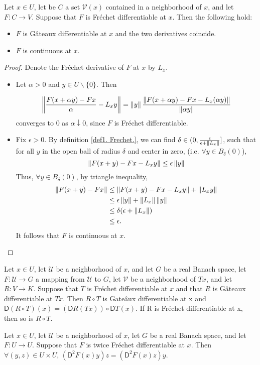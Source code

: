 \begin{lemma}
	Let $x \in U$, let be $C$ a set $\mathcal{V}(x)$ contained in a neighborhood of $x$, and let $F: C \rightarrow V$. Suppose that $F$ is Fr\'echet differentiable at $x$. Then the following hold:
	\begin{itemize}
	\item  $F$ is G\^ateaux differentiable at $x$ and the two derivatives coincide.
	\item $F$ is continuous at $x$.
	\end{itemize}
	\begin{proof}
		Denote the Fr\'echet derivative of $F$ at $x$ by $L_x$.
		\begin{itemize}
			\item Let $\alpha >0$ and $y \in U\backslash\{0\}$. Then
			
			\[
				\left\lVert\frac{F(x+\alpha y)-Fx}{\alpha}-L_xy\right\rVert = \left\lVert y\right\rVert\frac{\left\lVert F(x+\alpha y)-Fx-L_x(\alpha y)\right\rVert}{\left\lVert\alpha y\right\rVert}
			\]
			converges to $0$ as $\alpha \downarrow 0$, since $F$ is Fr\'echet differentiable.
			\item Fix $\epsilon > 0$. By definition \ref{def1. Frechet.}, we can find $\delta \in  (0, \frac{\epsilon}{\epsilon + \left\lVert L_x\right\rVert}]$, such that for all $y$ in the open ball of radius $\delta$ and center in zero, (i.e. $\forall y \in B_\delta(0)$), 
			\[
			   \left\lVert F(x+y)-Fx-L_xy\right\rVert \leq \epsilon \left\lVert y\right\rVert\]
			Thus, $\forall y \in B_\delta(0)$,  by triangle inequality, 
			 \begin{align*}  
			\left\lVert F(x+y)-Fx\right\rVert &\leq \left\lVert F(x+y) -Fx-L_xy\right\rVert + 
			\left\lVert L_xy\right\rVert \\ &\leq \epsilon \left\lVert y\right\rVert + \left\lVert L_x \right\rVert\left\lVert y\right\rVert \\ &\leq \delta(\epsilon + \left\lVert L_x\right\rVert)
			\\
			&\leq \epsilon.
			\end{align*}
			It follows that $F$ is continuous at $x$.
		\end{itemize}
	\end{proof}
\end{lemma}



\begin{fact}
	Let $x\in U$,  let $\mathcal{U}$ be a neighborhood of $x$, and let $G$ be a real Banach space, let $F: \mathcal{U}\rightarrow G$ a mapping from $\mathcal{U}$ to $G$, let $\mathcal{V}$ be a neighborhood of $Tx$, and let $R : V \rightarrow K$.
	Suppose that $T$ is Fr\'echet differentiable at $x$ and that $R$ is G\^ateaux differentiable at $Tx$. Then $R\circ T$ is Gate\^aux differentiable at x and $\mathsf{D}(R \circ T )(x) =
	(\mathsf{D}R(Tx))\circ \mathsf{D}T (x)$. If R is Fr\'echet differentiable at x, then so is $R \circ T $.
\end{fact}

\begin{fact}[]
	Let $x \in U$, let $\mathcal{U}$ be a neighborhood of $x$, let $G$ be a real Banach
	space, and let $F: U \rightarrow U$. Suppose that $F$ is twice Fr\'echet differentiable at $x$.
	Then $\forall (y,z) \in U \times U$,  $(\mathsf{D}^2 F (x)y)z = (\mathsf{D}^2 F (x)z)y$.
\end{fact}


